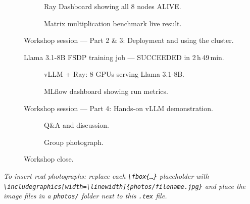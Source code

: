 \documentclass[12pt,a4paper]{article}
\begin{document}
\begin{figure}[H]
\centering
\begin{subfigure}[t]{0.47\textwidth}
  \centering
  \fbox{\rule{0pt}{5.5cm}\hspace{\dimexpr\linewidth-2\fboxsep-2\fboxrule\relax}}
  \caption{Ray Dashboard showing all 8 nodes ALIVE.}
\end{subfigure}
\hfill
\begin{subfigure}[t]{0.47\textwidth}
  \centering
  \fbox{\rule{0pt}{5.5cm}\hspace{\dimexpr\linewidth-2\fboxsep-2\fboxrule\relax}}
  \caption{Matrix multiplication benchmark live result.}
\end{subfigure}
\caption{Workshop session --- Part 2 \& 3: Deployment and using the cluster.}
\end{figure}

\begin{figure}[H]
\centering
\fbox{\rule{0pt}{7.5cm}\hspace{\dimexpr\textwidth-2\fboxsep-2\fboxrule\relax}}
\caption{Llama 3.1-8B FSDP training job --- SUCCEEDED in 2\,h\,49\,min.}
\end{figure}

\begin{figure}[H]
\centering
\begin{subfigure}[t]{0.47\textwidth}
  \centering
  \fbox{\rule{0pt}{5.5cm}\hspace{\dimexpr\linewidth-2\fboxsep-2\fboxrule\relax}}
  \caption{vLLM + Ray: 8 GPUs serving Llama 3.1-8B.}
\end{subfigure}
\hfill
\begin{subfigure}[t]{0.47\textwidth}
  \centering
  \fbox{\rule{0pt}{5.5cm}\hspace{\dimexpr\linewidth-2\fboxsep-2\fboxrule\relax}}
  \caption{MLflow dashboard showing run metrics.}
\end{subfigure}
\caption{Workshop session --- Part 4: Hands-on vLLM demonstration.}
\end{figure}

\begin{figure}[H]
\centering
\begin{subfigure}[t]{0.47\textwidth}
  \centering
  \fbox{\rule{0pt}{5.5cm}\hspace{\dimexpr\linewidth-2\fboxsep-2\fboxrule\relax}}
  \caption{Q\&A and discussion.}
\end{subfigure}
\hfill
\begin{subfigure}[t]{0.47\textwidth}
  \centering
  \fbox{\rule{0pt}{5.5cm}\hspace{\dimexpr\linewidth-2\fboxsep-2\fboxrule\relax}}
  \caption{Group photograph.}
\end{subfigure}
\caption{Workshop close.}
\end{figure}

\vspace{1.5em}
\noindent\textit{To insert real photographs: replace each
\texttt{\textbackslash fbox\{\ldots\}} placeholder with
\texttt{\textbackslash includegraphics[width=\textbackslash linewidth]\{photos/filename.jpg\}}
and place the image files in a \texttt{photos/} folder next to this
\texttt{.tex} file.}
\end{document}
